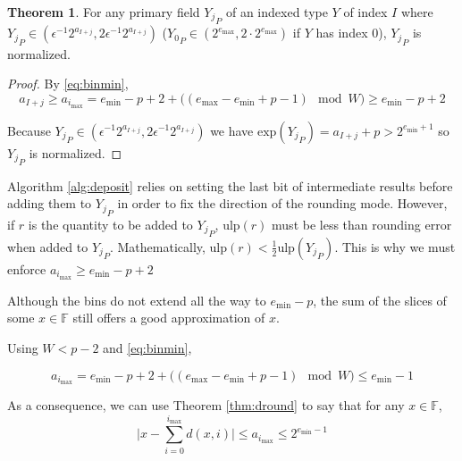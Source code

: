 \documentclass[12pt]{article}
\providecommand{\F}{\ensuremath{\mathbb{F}}}
\providecommand{\exp}{\ensuremath{\text{exp}}}
\providecommand{\min}{\ensuremath{\text{min}}}
\providecommand{\max}{\ensuremath{\text{max}}}
\providecommand{\ulp}{\ensuremath{\text{ulp}}}
\theoremstyle{definition}
\newtheorem{thm}{Theorem}[section]
\numberwithin{equation}{section}
\numberwithin{figure}{section}
\begin{document}
      \begin{samepage}
      \begin{thm}
        For any primary field ${Y_j}_P$ of an indexed type $Y$ of index $I$ where ${Y_j}_P \in (\epsilon^{-1} 2^{a_{I + j}}, 2 \epsilon^{-1} 2^{a_{I + j}})$ (${Y_0}_P \in (2^{e_{\max}}, 2 \cdot 2^{e_{\max}})$ if $Y$ has index 0), ${Y_j}_P$ is normalized.
        \label{thm:underflowufp}
      \end{thm}
      \end{samepage}

      \begin{proof}
        By \eqref{eq:binmin},
        \begin{equation*}
        a_{I + j} \geq a_{i_{\max}} = e_{\min} - p + 2 + \bigl((e_{\max} - e_{\min} + p - 1) \mod W\bigr) \geq e_{\min} - p + 2
        \end{equation*}

        Because ${Y_j}_P \in (\epsilon^{-1} 2^{a_{I + j}}, 2 \epsilon^{-1} 2^{a_{I + j}})$ we have $\exp({Y_j}_P) = a_{I + j} + p > 2^{e_{\min} + 1}$ so ${Y_j}_P$ is normalized.
      \end{proof}

      Algorithm \ref{alg:deposit} relies on setting the last bit of intermediate results before adding them to ${Y_j}_P$ in order to fix the direction of the rounding mode. However, if $r$ is the quantity to be added to ${Y_j}_P$, $\ulp(r)$ must be less than rounding error when added to ${Y_j}_P$. Mathematically, $\ulp(r) < \frac{1}{2}\ulp({Y_j}_P)$. This is why we must enforce $a_{i_{\max}} \geq e_{\min} - p + 2$

      Although the bins do not extend all the way to $e_{\min} - p$, the sum of the slices of some $x \in \F$ still offers a good approximation of $x$.

      Using $W < p - 2$ and \eqref{eq:binmin},

      \begin{equation*}
        a_{i_{\max}} = e_{\min} - p + 2 + \bigl((e_{\max} - e_{\min} + p - 1 ) \mod W\bigr) \leq {e_{\min} - 1}
      \end{equation*}

      As a consequence, we can use Theorem \ref{thm:dround} to say that for any $x \in \F$,
      \begin{equation}
        \bigl|x - \sum\limits_{i = 0}^{i_{\max}} d(x, i)\bigr| \leq a_{i_{\max}} \leq 2^{e_{\min} - 1}
        \label{eq:droundunderflow}
      \end{equation}
\end{document}
